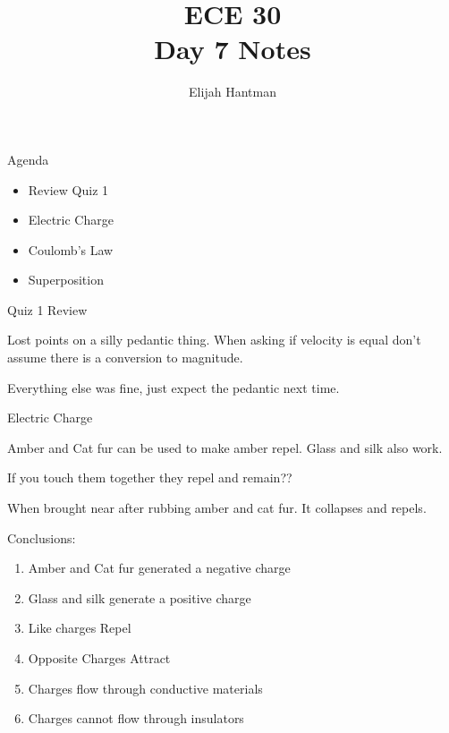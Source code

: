 \documentclass{report}
\title{\Huge{ECE 30}\\Day 7 Notes}
\author{\huge{Elijah Hantman}}
\date{}
\begin{document}
\maketitle
\newpage

\begin{description}
    \item {\large Agenda} 
        \begin{itemize}
            \item Review Quiz 1
            \item Electric Charge
            \item Coulomb's Law
            \item Superposition
        \end{itemize}
    \item {\large Quiz 1 Review}
        \begin{mdframed}
            Lost points on a silly pedantic thing.
            When asking if velocity is equal don't assume
            there is a conversion to magnitude.

            Everything else was fine, just expect the
            pedantic next time.
        \end{mdframed}
    \item {\large Electric Charge}
        \begin{mdframed}
            Amber and Cat fur can be used to make amber repel. 
            Glass and silk also work.

            If you touch them together they repel and
            remain??

            When brought near after rubbing amber and cat
            fur. It collapses and repels.

            Conclusions:
            \begin{enumerate}
                \item Amber and Cat fur generated a negative
                    charge
                \item Glass and silk generate a positive
                    charge
                \item Like charges Repel
                \item Opposite Charges Attract
                \item Charges flow through conductive
                    materials
                \item Charges cannot flow through insulators
            \end{enumerate}


\end{mdframed}
\end{description}
\end{document}

